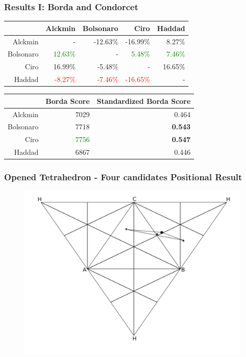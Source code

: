\documentclass{beamer}
\begin{document}
\begin{frame}
  \frametitle{Results I: Borda and Condorcet}

\begin{table}[!h]
\centering
\begin{tabular}{rrrrr} & Alckmin & Bolsonaro & Ciro & Haddad \\\hline Alckmin &
  - & -12.63\% & -16.99\% & 8.27\% \\ Bolsonaro & \textcolor{green}{12.63\%} & -
  & \textcolor{green}{5.48\%} & \textcolor{green}{7.46\%} \\ Ciro & 16.99\% &
  -5.48\% & - & 16.65\% \\ Haddad & \textcolor{red}{-8.27\%} &
  \textcolor{red}{-7.46\%} & \textcolor{red}{-16.65\%} & - \\\hline
          \end{tabular}
          \quad

          \begin{tabular}{rrr} \hline & Borda Score & Standardized Borda Score\\
            \hline
            Alckmin & 7029 & 0.464 \\ Bolsonaro & 7718 & \textbf{0.543} \\ Ciro & \textcolor{green}{7756} & \textbf{0.547}\\
            Haddad & 6867 & 0.446 \\ \hline
\end{tabular}
\end{table}

\end{frame}

\begin{frame}
  \frametitle{Opened Tetrahedron - Four candidates Positional Result}
\begin{figure}[!h] \centering \includegraphics[width=\textwidth]{../images/opened_tetrahedron1.png}
 
\end{figure}

\end{frame}
\end{document}

